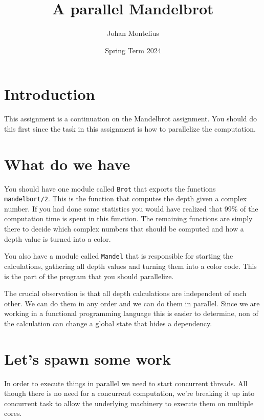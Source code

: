 \documentclass[a4paper,11pt]{article}
\begin{document}
\title{A parallel Mandelbrot}

\author{Johan Montelius}
\date{Spring Term 2024}

\maketitle


\section*{Introduction}

This assignment is a continuation on the Mandelbrot assignment. You
should do this first since the task in this assignment is how to
parallelize the computation.


\section*{What do we have}

You should have one module called {\tt Brot} that exports the
functions {\tt mandelbort/2}. This is the function that computes the
depth given a complex number. If you had done some statistics you
would have realized that 99\% of the computation time is spent
in this function. The remaining functions are simply there to decide
which complex numbers that should be computed and how a depth value is
turned into a color.

You also have a module called {\tt Mandel} that is responsible for
starting the calculations, gathering all depth values and turning them
into a color code. This is the part of the program that you should
parallelize.

The crucial observation is that all depth calculations are independent
of each other. We can do them in any order and we can do them in
parallel. Since we are working in a functional programming language
this is easier to determine, non of the calculation can change a
global state that hides a dependency. 


\section*{Let's spawn some work}

In order to execute things in parallel we need to start concurrent
threads. All though there is no need for a concurrent computation,
we're breaking it up into concurrent task to allow the underlying
machinery to execute them on multiple cores.
\end{document}
